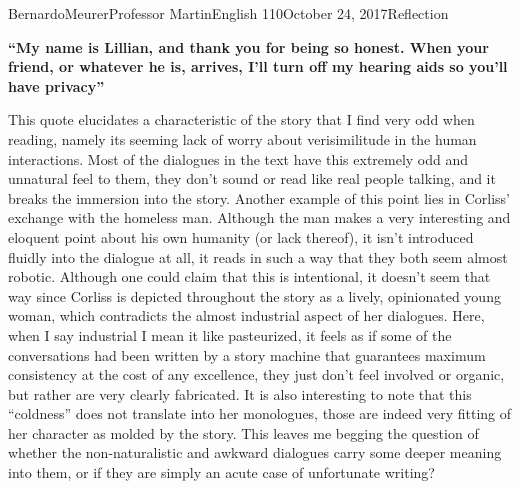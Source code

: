 \documentclass[12pt,letterpaper]{article}
\begin{document}
\begin{mla}{Bernardo}{Meurer}{Professor Martin}{English 110}{October 24, 2017}{Reflection}
\begin{singlespace}
    \textbf{``My name is Lillian, and thank you for being so honest. When your friend, or whatever he is, arrives, I'll turn off my hearing aids so you'll have privacy''}
\end{singlespace}

This quote elucidates a characteristic of the story that I find very odd when reading, namely its seeming lack of worry about verisimilitude in the human interactions. Most of the dialogues in the text have this extremely odd and unnatural feel to them, they don't sound or read like real people talking, and it breaks the immersion into the story. Another example of this point lies in Corliss' exchange with the homeless man. Although the man makes a very interesting and eloquent point about his own humanity (or lack thereof), it isn't introduced fluidly into the dialogue at all, it reads in such a way that they both seem almost robotic. Although one could claim that this is intentional, it doesn't seem that way since Corliss is depicted throughout the story as a lively, opinionated young woman, which contradicts the almost industrial aspect of her dialogues. Here, when I say industrial I mean it like pasteurized, it feels as if some of the conversations had been written by a story machine that guarantees maximum consistency at the cost of any excellence, they just don't feel involved or organic, but rather are very clearly fabricated. It is also interesting to note that this ``coldness'' does not translate into her monologues, those are indeed very fitting of her character as molded by the story. This leaves me begging the question of whether the non-naturalistic and awkward dialogues carry some deeper meaning into them, or if they are simply an acute case of unfortunate writing?

\end{mla}
\end{document}
